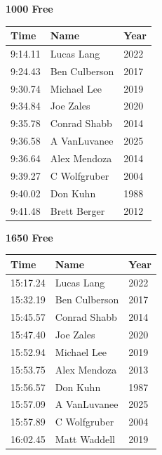 \vspace{1.2em}
\noindent\begin{minipage}[t]{0.48\textwidth}
\centering
\textbf{\textcolor{teamprimary}{1000 Free}}\par
\vspace{0.5em}
\centering
\small
\renewcommand{\arraystretch}{1.0}
\setlength{\tabcolsep}{4pt}
\begin{tabular}{@{}p{1.8cm}p{3.0cm}p{1.0cm}@{}}
\toprule
\textbf{Time} & \textbf{Name} & \textbf{Year} \\
\midrule
9:14.11 & Lucas Lang & 2022 \\
9:24.43 & Ben Culberson & 2017 \\
9:30.74 & Michael Lee & 2019 \\
9:34.84 & Joe Zales & 2020 \\
9:35.78 & Conrad Shabb & 2014 \\
9:36.58 & A VanLuvanee & 2025 \\
9:36.64 & Alex Mendoza & 2014 \\
9:39.27 & C Wolfgruber & 2004 \\
9:40.02 & Don Kuhn & 1988 \\
9:41.48 & Brett Berger & 2012 \\
\bottomrule
\end{tabular}
\end{minipage}
\hfill
\begin{minipage}[t]{0.48\textwidth}
\centering
\textbf{\textcolor{teamprimary}{1650 Free}}\par
\vspace{0.5em}
\centering
\small
\renewcommand{\arraystretch}{1.0}
\setlength{\tabcolsep}{4pt}
\begin{tabular}{@{}p{1.8cm}p{3.0cm}p{1.0cm}@{}}
\toprule
\textbf{Time} & \textbf{Name} & \textbf{Year} \\
\midrule
15:17.24 & Lucas Lang & 2022 \\
15:32.19 & Ben Culberson & 2017 \\
15:45.57 & Conrad Shabb & 2014 \\
15:47.40 & Joe Zales & 2020 \\
15:52.94 & Michael Lee & 2019 \\
15:53.75 & Alex Mendoza & 2013 \\
15:56.57 & Don Kuhn & 1987 \\
15:57.09 & A VanLuvanee & 2025 \\
15:57.89 & C Wolfgruber & 2004 \\
16:02.45 & Matt Waddell & 2019 \\
\bottomrule
\end{tabular}
\end{minipage}
